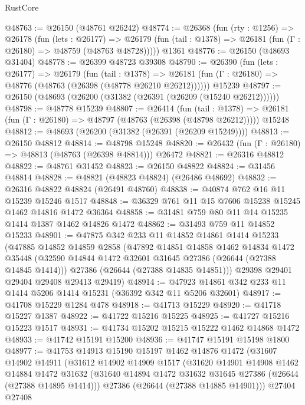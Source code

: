 \begin{lexlean}{RustCore}
\begin{coremodule}
@48763 := @26150 (@48761 @26242)
@48774 := @26368
    (fun (rty : @1256) =>
    @26178
      (fun (lets : @26177) =>
      @26179 (fun (tail : @1378) => @26181 (fun (Γ : @26180) => @48759 (@48763 @48728)))))
    @1361
@48776 := @26150 (@48693 @31404)
@48778 := @26399 @48723 @39308
@48790 := @26390
    (fun (lets : @26177) =>
    @26179
      (fun (tail : @1378) =>
      @26181 (fun (Γ : @26180) => @48776 (@48763 (@26398 (@48778 @26210 @26212))))))
    @15239
@48797 := @26150 (@48693 (@26200 (@31382 (@26391 (@26209 (@15240 @26212))))))
@48798 := @48778 @15239
@48807 := @26414
    (fun (tail : @1378) => @26181 (fun (Γ : @26180) => @48797 (@48763 (@26398 (@48798 @26212)))))
    @15248
@48812 := @48693 (@26200 (@31382 (@26391 (@26209 @15249))))
@48813 := @26150 @48812
@48814 := @48798 @15248
@48820 := @26432 (fun (Γ : @26180) => @48813 (@48763 (@26398 @48814))) @26472
@48821 := @26316 @48812
@48822 := @48761 @31452
@48823 := @26150 @48822
@48824 := @31456 @48814
@48828 := @48821 (@48823 @48824) (@26486 @48692)
@48832 := @26316 @48822 @48824 (@26491 @48760)
@48838 := @40874 @762 @16 @11 @15239 @15246 @1517
@48848 := @36329 @761 @11 @15 @7606 @15238 @15245 @1462 @14816 @1472 @36364
@48858 := @31481 @759 @80 @11 @14 @15235 @1414 @1387 @1462 @14826 @1472
@48862 := @31493 @759 @11 @14852 @15233
@48901 := @47875
    @342
    @233
    @11
    @14852
    @14861
    @1414
    @15233
    (@47885
      @14852
      @14859
      @2858
      (@47892
        @14851
        @14858
        @1462
        @14834
        @1472
        @35448
        (@32590 @14844 @1472 @32601 @31645 @27386 (@26644 (@27388 @14845 @1414)))
        @27386
        (@26644 (@27388 @14835 @14851)))
      @29398
      @29401
      @29404
      @29408
      @29413
      @29419)
@48914 := @47923 @14861 @342 @233 @11 @1414 @5206 @1414 @15231 (@36392 @342 @11 @5206 @32601)
@48917 := @41708 @15229 @1284 @478
@48918 := @41713 @15229
@48920 := @41718 @15227 @1387
@48922 := @41722 @15216 @15225
@48925 := @41727 @15216 @15223 @1517
@48931 := @41734 @15202 @15215 @15222 @1462 @14868 @1472
@48933 := @41742 @15191 @15200
@48936 := @41747 @15191 @15198 @1800
@48977 := @41753
    @14913
    @15190
    @15197
    @1462
    @14876
    @1472
    (@31607
      @14902
      @14911
      (@31612
        @14902
        @14909
        @1517
        (@31620
          @14901
          @14908
          @1462
          @14884
          @1472
          @31632
          (@31640 @14894 @1472 @31632 @31645 @27386 (@26644 (@27388 @14895 @1414)))
          @27386
          (@26644 (@27388 @14885 @14901)))
        @27404
        @27408

\end{coremodule}
\end{lexlean}
